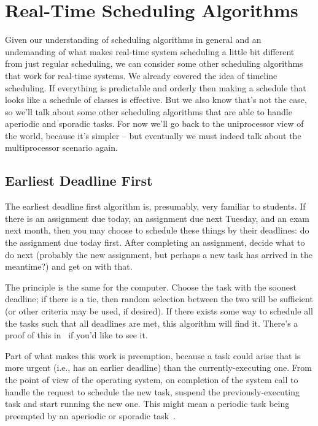 




\section*{Real-Time Scheduling Algorithms}

Given our understanding of scheduling algorithms in general and an undemanding of what makes real-time system scheduling a little bit different from just regular scheduling, we can consider some other scheduling algorithms that work for real-time systems. We already covered the idea of timeline scheduling. If everything is predictable and orderly then making a schedule that looks like a schedule of classes is effective. But we also know that's not the case, so we'll talk about some other scheduling algorithms that are able to handle aperiodic and sporadic tasks. For now we'll go back to the uniprocessor view of the world, because it's simpler -- but eventually we must indeed talk about the multiprocessor scenario again.

\subsection*{Earliest Deadline First}

The earliest deadline first algorithm is, presumably, very familiar to students. If there is an assignment due today, an assignment due next Tuesday, and an exam next month, then you may choose to schedule these things by their deadlines: do the assignment due today first. After completing an assignment, decide what to do next (probably the new assignment, but perhaps a new task has arrived in the meantime?) and get on with that.

The principle is the same for the computer. Choose the task with the soonest deadline; if there is a tie, then random selection between the two will be sufficient (or other criteria may be used, if desired). If there exists some way to schedule all the tasks such that all deadlines are met, this algorithm will find it. There's a proof of this in~\cite{mte241} if you'd like to see it.

Part of what makes this work is preemption, because a task could arise that is more urgent (i.e., has an earlier deadline) than the currently-executing one. From the point of view of the operating system, on completion of the system call to handle the request to schedule the new task, suspend the previously-executing task and start running the new one. This might mean a periodic task being preempted by an aperiodic or sporadic task~\cite{mte241}.

